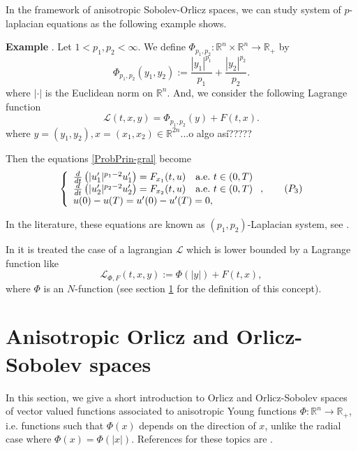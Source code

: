 \documentclass[twoside]{article}
\theoremstyle{remark}
\newcommand{\rr}{\mathbb{R}}
\newcounter{example}
\newenvironment{example}{\noindent\textbf{Example \arabic{example}}.}{\addtocounter{example}{1}}
\begin{document}
In the framework of anisotropic Sobolev-Orlicz spaces, we can study system of $p$-laplacian equations as the following example shows.


\begin{example}\label{ex:phip1p2} Let $1<p_1,p_2<\infty$. We define $\Phi_{p_1,p_2}:\rr^n\times \rr^n\to\rr_+$   by
\[\Phi_{p_1,p_2}(y_1,y_2):=\frac{|y_1|^{p_1}}{p_1}+\frac{|y_2|^{p_2}}{p_2}.\]
where $|\cdot|$ is the Euclidean norm on $\rr^n$.
And, we consider the following Lagrange function
\[\mathcal{L}(t,x,y)=\Phi_{p_1,p_2}(y)+F(t,x).\]
where $y=(y_1,y_2), x=(x_1,x_2)\in \rr^{2n}$...o algo as\'i?????

Then the equations \eqref{ProbPrin-gral} become
\begin{equation}\label{eq:sist-p_lapa}
    \left\{%
\begin{array}{ll}
  \frac{d}{dt}\left(|u_1'|^{p_1-2}u_1'\right)=F_{x_1}(t,u) \quad \hbox{a.e.}\ t \in (0,T)\\
  \frac{d}{dt}\left(|u_2'|^{p_2-2}u_2'\right)=F_{x_2}(t,u) \quad \hbox{a.e.}\ t \in (0,T)\\
   u(0)-u(T)=u'(0)-u'(T)=0,
\end{array}%
\right., \tag{$P_3$}
\end{equation}



\end{example}


In the literature, these equations are known as $(p_1,p_2)$-Laplacian system, see
\cite{yang2013existence,pasca2016periodic,yang2012periodic,pasca2010periodic,pacsca2010some,pasca2011some}.



In \cite{ABGMS2015} it is treated  the case of a lagrangian $\mathcal{L}$ which is lower bounded by a Lagrange function like
\begin{equation}\label{eq:lagrange_phi}
\mathcal{L}_{\Phi,F}(t,x,y):=\Phi(|y|)+F(t,x),
\end{equation}
where  $\Phi$ is an $N$-function (see section \ref{preliminares} for the definition of this concept).


\section{Anisotropic Orlicz and Orlicz-Sobolev spaces}\label{preliminares}

In this section, we give a short introduction to  Orlicz and Orlicz-Sobolev spaces of vector valued functions associated to anisotropic Young functions $\Phi:\rr^n\to\rr_+$, i.e. functions such that $\Phi(x)$ depends on the direction of $x$, unlike the radial case where $\Phi(x)=\Phi(|x|)$.  References for  these topics are \cite{Orliczvectorial2005,Skaff1969, Desch2001}.
\end{document}
